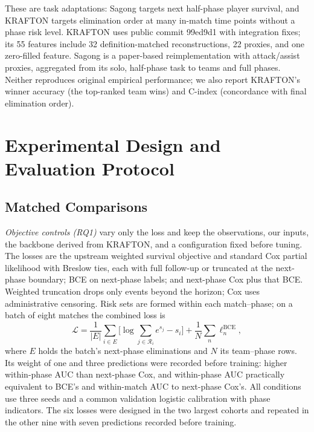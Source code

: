 \documentclass[sigconf,anonymous]{acmart}
\begin{document}
These are task adaptations: Sagong targets next half-phase player survival, and KRAFTON targets elimination order at many in-match time points without a phase risk level. KRAFTON uses public commit 99ed9d1 with integration fixes; its 55 features include 32 definition-matched reconstructions, 22 proxies, and one zero-filled feature. Sagong is a paper-based reimplementation with attack/assist proxies, aggregated from its solo, half-phase task to teams and full phases. Neither reproduces original empirical performance; we also report KRAFTON's winner accuracy (the top-ranked team wins) and C-index (concordance with final elimination order).

\section{Experimental Design and Evaluation Protocol}
\label{sec:method:evaluation}
\subsection{Matched Comparisons}
\label{sec:method:decomposition}
\emph{Objective controls (RQ1)} vary only the loss and keep the observations, our inputs, the backbone derived from KRAFTON, and a configuration fixed before tuning. The losses are the upstream weighted survival objective and standard Cox partial likelihood with Breslow ties, each with full follow-up or truncated at the next-phase boundary; BCE on next-phase labels; and next-phase Cox plus that BCE. Weighted truncation drops only events beyond the horizon; Cox uses administrative censoring. Risk sets are formed within each match--phase; on a batch of eight matches the combined loss is
\begin{equation}
\mathcal{L}=\frac{1}{|E|}\sum_{i\in E}\Big[\log\sum_{j\in\mathcal{R}_i}e^{s_j}-s_i\Big]+\frac{1}{N}\sum_{n}\ell^{\mathrm{BCE}}_n,
\label{eq:combined}
\end{equation}
where $E$ holds the batch's next-phase eliminations and $N$ its team--phase rows. Its weight of one and three predictions were recorded before training: higher within-phase AUC than next-phase Cox, and within-phase AUC practically equivalent to BCE's and within-match AUC to next-phase Cox's. All conditions use three seeds and a common validation logistic calibration with phase indicators. The six losses were designed in the two largest cohorts and repeated in the other nine with seven predictions recorded before training.
\end{document}
